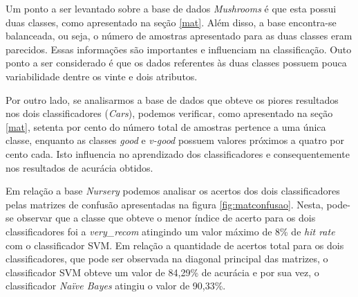 \documentclass[12pt]{article}
\begin{document}
    Um ponto a ser levantado sobre a base de dados \textit{Mushrooms} é que esta possui duas classes, como apresentado na seção \ref{mat}. Além disso, a base encontra-se balanceada, ou seja, o número de amostras apresentado para as duas classes eram parecidos. Essas informações são importantes e influenciam na classificação. Outo ponto a ser considerado é que os dados referentes às duas classes possuem pouca variabilidade dentre os vinte e dois atributos.
    
    Por outro lado, se analisarmos a base de dados que obteve os piores resultados nos dois classificadores (\textit{Cars}), podemos verificar, como apresentado na seção \ref{mat}, setenta por cento do número total de amostras pertence a uma única classe, enquanto as classes \textit{good} e \textit{v-good} possuem valores próximos a quatro por cento cada. Isto influencia no aprendizado dos classificadores e consequentemente nos resultados de acurácia obtidos.
    
    \begin{table}[h]
            \centering
            \caption{Valores da análise das classificações realizadas, para as diferentes bases, utilizando o algoritmo \textit{Naïve Bayes}. Os valores aqui apresentados são uma média ponderada dentre as classes de cada uma das bases.}
            \label{tab:matNB}
    \end{table}

    Em relação a base \textit{Nursery} podemos analisar os acertos dos dois classificadores pelas matrizes de confusão apresentadas na figura \ref{fig:matconfusao}. Nesta, pode-se observar que a classe que obteve o menor índice de acerto para os dois classificadores foi a \textit{very\_recom} atingindo um valor máximo de 8\% de \textit{hit rate} com o classificador SVM. Em relação a quantidade de acertos total para os dois classificadores, que pode ser observada na diagonal principal das matrizes, o classificador SVM obteve um valor de 84,29\% de acurácia e por sua vez, o classificador \textit{Naïve Bayes} atingiu o valor de 90,33\%.
    
\end{document}
